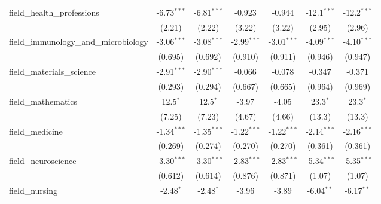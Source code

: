 \begin{tabular}{lcccccc}
   field\_health\_professions                                  & -6.73$^{***}$ & -6.81$^{***}$ & -0.923        & -0.944        & -12.1$^{***}$ & -12.2$^{***}$\\   
                                                               & (2.21)        & (2.22)        & (3.22)        & (3.22)        & (2.95)        & (2.96)\\   
   field\_immunology\_and\_microbiology                        & -3.06$^{***}$ & -3.08$^{***}$ & -2.99$^{***}$ & -3.01$^{***}$ & -4.09$^{***}$ & -4.10$^{***}$\\   
                                                               & (0.695)       & (0.692)       & (0.910)       & (0.911)       & (0.946)       & (0.947)\\   
   field\_materials\_science                                   & -2.91$^{***}$ & -2.90$^{***}$ & -0.066        & -0.078        & -0.347        & -0.371\\   
                                                               & (0.293)       & (0.294)       & (0.667)       & (0.665)       & (0.964)       & (0.969)\\   
   field\_mathematics                                          & 12.5$^{*}$    & 12.5$^{*}$    & -3.97         & -4.05         & 23.3$^{*}$    & 23.3$^{*}$\\   
                                                               & (7.25)        & (7.23)        & (4.67)        & (4.66)        & (13.3)        & (13.3)\\   
   field\_medicine                                             & -1.34$^{***}$ & -1.35$^{***}$ & -1.22$^{***}$ & -1.22$^{***}$ & -2.14$^{***}$ & -2.16$^{***}$\\   
                                                               & (0.269)       & (0.274)       & (0.270)       & (0.270)       & (0.361)       & (0.361)\\   
   field\_neuroscience                                         & -3.30$^{***}$ & -3.30$^{***}$ & -2.83$^{***}$ & -2.83$^{***}$ & -5.34$^{***}$ & -5.35$^{***}$\\   
                                                               & (0.612)       & (0.614)       & (0.876)       & (0.871)       & (1.07)        & (1.07)\\   
   field\_nursing                                              & -2.48$^{*}$   & -2.48$^{*}$   & -3.96         & -3.89         & -6.04$^{**}$  & -6.17$^{**}$\\   

\end{tabular}

